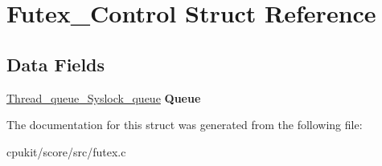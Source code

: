\hypertarget{structFutex__Control}{}\section{Futex\+\_\+\+Control Struct Reference}
\label{structFutex__Control}
\subsection*{Data Fields}
\begin{DoxyCompactItemize}
\item 
\mbox{\label{structFutex__Control_a9abea3c7a7ee7791db07d172371903d8}} 
\mbox{\hyperlink{structThread__queue__Syslock__queue}{Thread\+\_\+queue\+\_\+\+Syslock\+\_\+queue}} {\bfseries Queue}
\end{DoxyCompactItemize}


The documentation for this struct was generated from the following file\+:\begin{DoxyCompactItemize}
\item 
cpukit/score/src/futex.\+c\end{DoxyCompactItemize}
